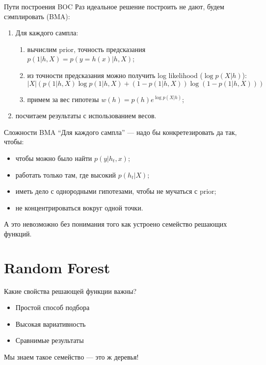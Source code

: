 \documentclass[14pt, fleqn, xcolor={dvipsnames, table}]{beamer}
\begin{document}
\begin{frame}{Пути построения BOC}
Раз идеальное решение построить не дают, будем сэмплировать (BMA):
\begin{enumerate}
  \item Для каждого сампла:
  \begin{enumerate}
    \item вычислим prior, точность предсказания $p(1| h, X) = p(y = h(x)|h,X)$;
    \item из точности предсказания можно получить log likelihood ($\log p(X|h)$):
    {\footnotesize$$
    |X| \left(p(1|h,X) \log p(1|h,X) + \left(1 - p(1|h,X)\right) \log \left(1 - p(1|h,X)\right) \right)
    $$}
    \item примем за вес гипотезы $w(h) = p(h) e^{\log p(X|h)}$;
  \end{enumerate}
  \item посчитаем результаты с использованием весов.
\end{enumerate}
\end{frame}

\begin{frame}{Сложности BMA}
 ``Для каждого сампла'' --- надо бы конкретезировать да так, чтобы:
\begin{itemize}
\small
  \item чтобы можно было найти $p(y|h_t,x)$;
  \item работать только там, где высокий $p(h_t | X)$;
  \item иметь дело с однородными гипотезами, чтобы не мучаться с prior;
  \item не концентрироваться вокруг одной точки.
\end{itemize}
А это невозможно без понимания того как устроено семейство решающих функций.
\end{frame}

\section{Random Forest}

\begin{frame}{Какие свойства решающей функции важны?}
\begin{itemize}
  \item Простой способ подбора
  \item Высокая вариативность
  \item Сравнимые результаты
\end{itemize}
Мы знаем такое семейство --- это ж деревья!
\end{frame}
\end{document}

